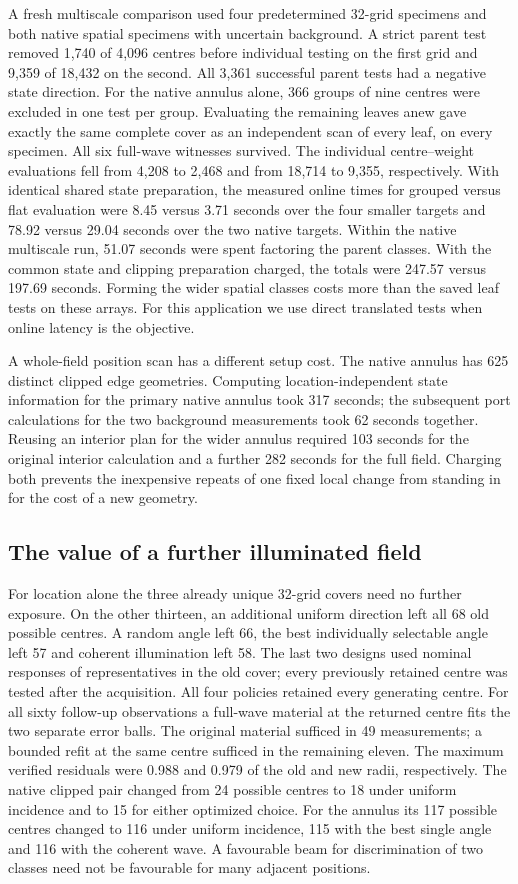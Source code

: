 A fresh multiscale comparison used four predetermined 32-grid specimens and both native spatial specimens with uncertain background. A strict parent test removed 1,740 of 4,096 centres before individual testing on the first grid and 9,359 of 18,432 on the second. All 3,361 successful parent tests had a negative state direction. For the native annulus alone, 366 groups of nine centres were excluded in one test per group. Evaluating the remaining leaves anew gave exactly the same complete cover as an independent scan of every leaf, on every specimen. All six full-wave witnesses survived. The individual centre--weight evaluations fell from 4,208 to 2,468 and from 18,714 to 9,355, respectively. With identical shared state preparation, the measured online times for grouped versus flat evaluation were 8.45 versus 3.71 seconds over the four smaller targets and 78.92 versus 29.04 seconds over the two native targets. Within the native multiscale run, 51.07 seconds were spent factoring the parent classes. With the common state and clipping preparation charged, the totals were 247.57 versus 197.69 seconds. Forming the wider spatial classes costs more than the saved leaf tests on these arrays. For this application we use direct translated tests when online latency is the objective.

A whole-field position scan has a different setup cost. The native annulus has 625 distinct clipped edge geometries. Computing location-independent state information for the primary native annulus took 317 seconds; the subsequent port calculations for the two background measurements took 62 seconds together. Reusing an interior plan for the wider annulus required 103 seconds for the original interior calculation and a further 282 seconds for the full field. Charging both prevents the inexpensive repeats of one fixed local change from standing in for the cost of a new geometry.

\subsection{The value of a further illuminated field}
For location alone the three already unique 32-grid covers need no further exposure. On the other thirteen, an additional uniform direction left all 68 old possible centres. A random angle left 66, the best individually selectable angle left 57 and coherent illumination left 58. The last two designs used nominal responses of representatives in the old cover; every previously retained centre was tested after the acquisition. All four policies retained every generating centre. For all sixty follow-up observations a full-wave material at the returned centre fits the two separate error balls. The original material sufficed in 49 measurements; a bounded refit at the same centre sufficed in the remaining eleven. The maximum verified residuals were 0.988 and 0.979 of the old and new radii, respectively. The native clipped pair changed from 24 possible centres to 18 under uniform incidence and to 15 for either optimized choice. For the annulus its 117 possible centres changed to 116 under uniform incidence, 115 with the best single angle and 116 with the coherent wave. A favourable beam for discrimination of two classes need not be favourable for many adjacent positions.

